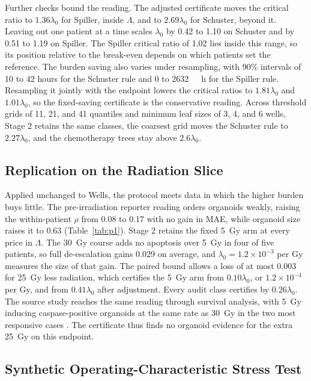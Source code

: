 \documentclass[conference]{IEEEtran}
\begin{document}
Further checks bound the reading. The adjusted certificate moves the critical ratio to \(1.36\lambda_0\) for Spiller, inside \(\Lambda\), and to \(2.69\lambda_0\) for Schuster, beyond it. Leaving out one patient at a time scales \(\lambda_0\) by 0.42 to 1.10 on Schuster and by 0.51 to 1.19 on Spiller. The Spiller critical ratio of 1.02 lies inside this range, so its position relative to the break-even depends on which patients set the reference. The burden saving also varies under resampling, with 90\% intervals of 10 to 42 hours for the Schuster rule and 0 to 2632~\si{\micro\molar\hour} for the Spiller rule. Resampling it jointly with the endpoint lowers the critical ratios to \(1.81\lambda_0\) and \(1.01\lambda_0\), so the fixed-saving certificate is the conservative reading. Across threshold grids of 11, 21, and 41 quantiles and minimum leaf sizes of 3, 4, and 6 wells, Stage 2 retains the same classes, the coarsest grid moves the Schuster rule to \(2.27\lambda_0\), and the chemotherapy trees stay above \(2.6\lambda_0\).

\subsection{Replication on the Radiation Slice}

Applied unchanged to Wells, the protocol meets data in which the higher burden buys little. The pre-irradiation reporter reading orders organoids weakly, raising the within-patient \(\rho\) from 0.08 to 0.17 with no gain in MAE, while organoid size raises it to 0.63 (Table~\ref{tab:p1}). Stage 2 retains the fixed 5~Gy arm at every price in \(\Lambda\). The 30~Gy course adds no apoptosis over 5~Gy in four of five patients, so full de-escalation gains 0.029 on average, and \(\lambda_0=1.2\times10^{-3}\) per Gy measures the size of that gain. The paired bound allows a loss of at most 0.003 for 25~Gy less radiation, which certifies the 5~Gy arm from \(0.10\lambda_0\), or \(1.2\times10^{-4}\) per Gy, and from \(0.41\lambda_0\) after adjustment. Every audit class certifies by \(0.26\lambda_0\). The source study reaches the same reading through survival analysis, with 5~Gy inducing caspase-positive organoids at the same rate as 30~Gy in the two most responsive cases \cite{wells2026}. The certificate thus finds no organoid evidence for the extra 25~Gy on this endpoint.

\subsection{Synthetic Operating-Characteristic Stress Test}
\label{sec:stress}
\end{document}
